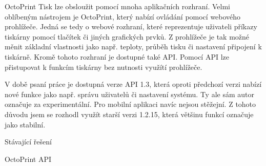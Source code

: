 OctoPrint
Tisk lze obsloužit pomocí mnoha aplikačních rozhraní.
Velmi oblíbeným nástrojem je OctoPrint, který nabízí ovládání pomocí webového prohlížeče.
Jedná se tedy o webové rozhraní, které reprezentuje uživateli příkazy tiskárny pomocí tlačítek či jiných grafických prvků.
Z prohlížeče je tak možné měnit základní vlastnosti jako např. teploty, průběh tisku či nastavení připojení k tiskárně.
Kromě tohoto rozhraní je dostupné také API.
Pomocí API lze přistupovat k funkcím tiskárny bez nutnosti využítí prohlížeče.

V době psaní práce je dostupná verze API 1.3, která oproti předchozí verzi nabízí nové funkce jako např. správu uživatelů či nastavení systému.
Ty ale sám autor označuje za experimentální.
Pro mobilní aplikaci navíc nejsou stěžejní.
Z tohoto důvodu jsem se rozhodl využít starší verzi 1.2.15, která většinu funkcí označuje jako stabilní.

Stávající řešení


OctoPrint
API
